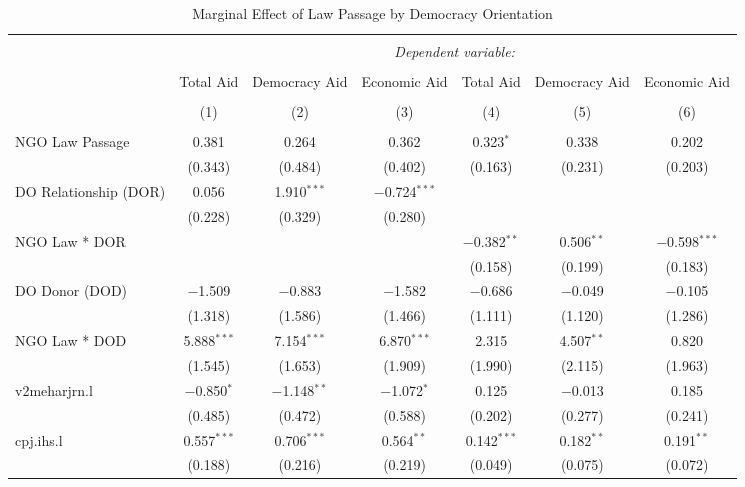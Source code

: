 
\begin{table}[!htbp] \centering 
  \caption{Marginal Effect of Law Passage by Democracy Orientation} 
  \label{tab:me} 
\footnotesize 
\begin{tabular}{@{\extracolsep{5pt}}lcccccc} 
\\[-1.8ex]\hline 
\hline \\[-1.8ex] 
 & \multicolumn{6}{c}{\textit{Dependent variable:}} \\ 
\cline{2-7} 
\\[-1.8ex] & Total Aid & Democracy Aid & Economic Aid & Total Aid & Democracy Aid & Economic Aid \\ 
\\[-1.8ex] & (1) & (2) & (3) & (4) & (5) & (6)\\ 
\hline \\[-1.8ex] 
 NGO Law Passage & 0.381 & 0.264 & 0.362 & 0.323$^{*}$ & 0.338 & 0.202 \\ 
  & (0.343) & (0.484) & (0.402) & (0.163) & (0.231) & (0.203) \\ 
  DO Relationship (DOR) & 0.056 & 1.910$^{***}$ & $-$0.724$^{***}$ &  &  &  \\ 
  & (0.228) & (0.329) & (0.280) &  &  &  \\ 
  NGO Law * DOR &  &  &  & $-$0.382$^{**}$ & 0.506$^{**}$ & $-$0.598$^{***}$ \\ 
  &  &  &  & (0.158) & (0.199) & (0.183) \\ 
  DO Donor (DOD) & $-$1.509 & $-$0.883 & $-$1.582 & $-$0.686 & $-$0.049 & $-$0.105 \\ 
  & (1.318) & (1.586) & (1.466) & (1.111) & (1.120) & (1.286) \\ 
  NGO Law * DOD & 5.888$^{***}$ & 7.154$^{***}$ & 6.870$^{***}$ & 2.315 & 4.507$^{**}$ & 0.820 \\ 
  & (1.545) & (1.653) & (1.909) & (1.990) & (2.115) & (1.963) \\ 
  v2meharjrn.l & $-$0.850$^{*}$ & $-$1.148$^{**}$ & $-$1.072$^{*}$ & 0.125 & $-$0.013 & 0.185 \\ 
  & (0.485) & (0.472) & (0.588) & (0.202) & (0.277) & (0.241) \\ 
  cpj.ihs.l & 0.557$^{***}$ & 0.706$^{***}$ & 0.564$^{**}$ & 0.142$^{***}$ & 0.182$^{**}$ & 0.191$^{**}$ \\ 
  & (0.188) & (0.216) & (0.219) & (0.049) & (0.075) & (0.072) \\ 

\end{tabular}
\end{table}

